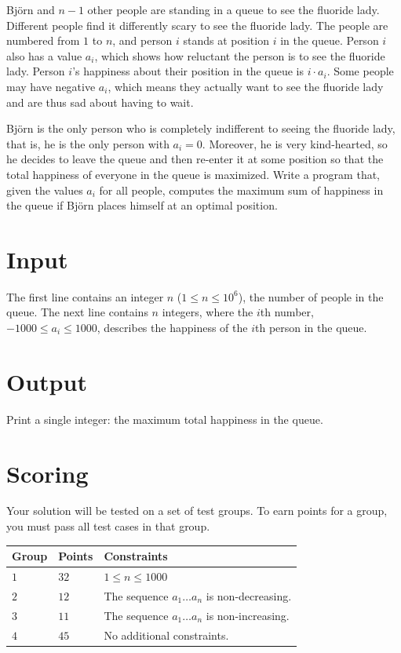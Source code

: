 Björn and $n-1$ other people are standing in a queue to see the fluoride lady. Different people find it differently scary to see the fluoride lady. The people are numbered from $1$ to $n$, and person $i$ stands at position $i$ in the queue. Person $i$ also has a value $a_i$, which shows how reluctant the person is to see the fluoride lady. Person $i$'s happiness about their position in the queue is $i \cdot a_i$. Some people may have negative $a_i$,
which means they actually want to see the fluoride lady and are thus sad about having to wait.

Björn is the only person who is completely indifferent to seeing the fluoride lady, that is, he is the only person with $a_i = 0$. Moreover, he is very kind-hearted, so he decides to leave the queue and then re-enter it at some position so that the total happiness of everyone in the queue is maximized. Write a program that, given the values $a_i$ for all people, computes the maximum sum of happiness in the queue if Björn places himself at an optimal position.

\section*{Input}
The first line contains an integer $n$ ($1 \le n \le 10^6$), the number of people in the queue. The next line contains $n$ integers, where the $i$th number, $-1000 \le a_i \le 1000$, describes the happiness of the $i$th person in the queue.

\section*{Output}
Print a single integer: the maximum total happiness in the queue.

\section*{Scoring}
Your solution will be tested on a set of test groups.
To earn points for a group, you must pass all test cases in that group.

\noindent
\begin{tabular}{| l | l | p{12cm} |}
  \hline
  Group & Points & Constraints \\ \hline
    $1$   & $32$     & $1 \leq n \leq 1000$ \\ \hline
    $2$   & $12$     & The sequence $a_1 \dots a_n$ is non-decreasing. \\ \hline
    $3$   & $11$     & The sequence $a_1 \dots a_n$ is non-increasing. \\ \hline
    $4$   & $45$     & No additional constraints. \\ \hline
\end{tabular}

